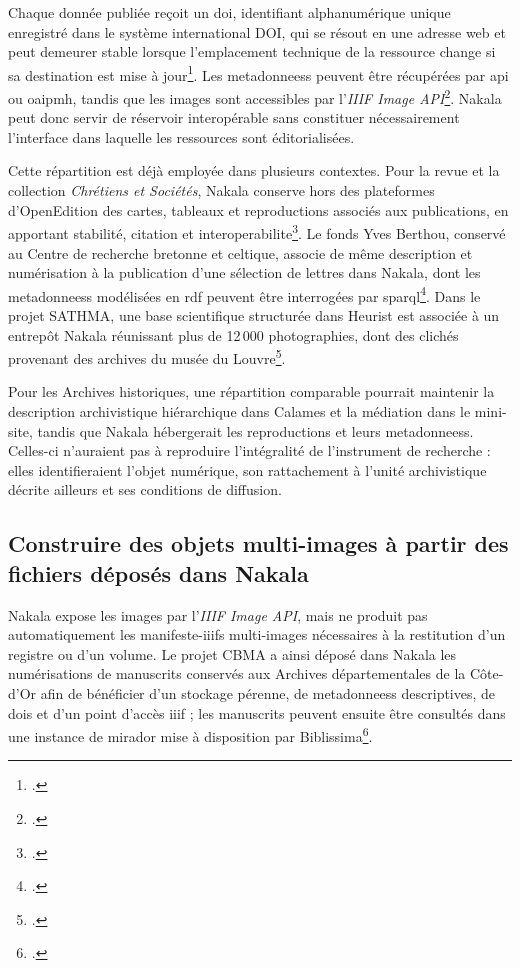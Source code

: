 Chaque donnée publiée reçoit un \gls{doi}, identifiant alphanumérique unique enregistré dans le système international DOI, qui se résout en une adresse web et peut demeurer stable lorsque l'emplacement technique de la ressource change si sa destination est mise à jour\footcite{DataCiteDOI}. Les \glspl{metadonnees} peuvent être récupérées par \gls{api} ou \gls{oaipmh}, tandis que les images sont accessibles par l'\emph{IIIF Image API}\footcite{HumaNumNakala}. Nakala peut donc servir de réservoir interopérable sans constituer nécessairement l'interface dans laquelle les ressources sont éditorialisées.

Cette répartition est déjà employée dans plusieurs contextes. Pour la revue et la collection \emph{Chrétiens et Sociétés}, Nakala conserve hors des plateformes d'OpenEdition des cartes, tableaux et reproductions associés aux publications, en apportant stabilité, citation et \gls{interoperabilite}\footcite{Chadier2024Nakala}. Le fonds Yves Berthou, conservé au Centre de recherche bretonne et celtique, associe de même description et numérisation à la publication d'une sélection de lettres dans Nakala, dont les \glspl{metadonnees} modélisées en \gls{rdf} peuvent être interrogées par \gls{sparql}\footcite{Pressac2026Berthou}. Dans le projet SATHMA, une base scientifique structurée dans Heurist est associée à un entrepôt Nakala réunissant plus de 12\,000 photographies, dont des clichés provenant des archives du musée du Louvre\footcite{ChevalierEtAl2025SATHMA}.

Pour les Archives historiques, une répartition comparable pourrait maintenir la description archivistique hiérarchique dans Calames et la médiation dans le mini-site, tandis que Nakala hébergerait les reproductions et leurs \glspl{metadonnees}. Celles-ci n'auraient pas à reproduire l'intégralité de l'instrument de recherche : elles identifieraient l'objet numérique, son rattachement à l'unité archivistique décrite ailleurs et ses conditions de diffusion.


\subsection{Construire des objets multi-images à partir des fichiers déposés dans Nakala}

Nakala expose les images par l'\emph{IIIF Image API}, mais ne produit pas automatiquement les \glspl{manifeste-iiif} multi-images nécessaires à la restitution d'un registre ou d'un volume. Le projet CBMA a ainsi déposé dans Nakala les numérisations de manuscrits conservés aux Archives départementales de la Côte-d'Or afin de bénéficier d'un stockage pérenne, de \glspl{metadonnees} descriptives, de \glspl{doi} et d'un point d'accès \gls{iiif} ; les manuscrits peuvent ensuite être consultés dans une instance de \gls{mirador} mise à disposition par Biblissima\footcite{Magnani2022CBMA}.

